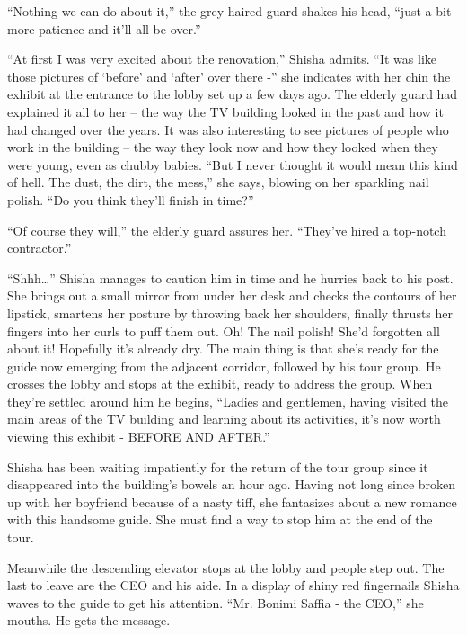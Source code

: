 \documentclass[twoside,11pt]{book}
\begin{document}
``Nothing we can do about it,'' the grey-haired guard shakes his head, ``just a
bit more patience and it'll all be over.''

``At first I was very excited about the renovation,'' Shisha admits. ``It was
like those pictures of `before' and `after' over there -'' she indicates with her chin the exhibit at the
entrance to the lobby set up a few days ago. The elderly guard had explained it all to her -- the way the TV building
looked in the past and how it had changed over the years. It was also interesting to see pictures of people who work in
the building -- the way they look now and how they looked when they were young, even as chubby babies.
``But I never thought it would mean this kind of hell. The dust, the dirt, the mess,'' she
says, blowing on her sparkling nail polish. ``Do you think they'll finish in time?''

``Of course they will,'' the elderly guard assures her. ``They've hired a
top-notch contractor.''

``Shhh{\dots}'' Shisha manages to caution him in time and he hurries back to his post. She
brings out a small mirror from under her desk and checks the contours of her lipstick, smartens her
posture by throwing back her shoulders, finally thrusts her fingers into her curls to puff them out.
Oh! The nail polish! She'd forgotten all about it! Hopefully it's already dry. The main thing is that she's ready for
the guide now emerging from the adjacent corridor, followed by his tour group. He crosses the lobby and stops at the
exhibit, ready to address the group. When they're settled around him he begins, ``Ladies and gentlemen,
having visited the main areas of the TV building and learning about its activities, it's now worth viewing this exhibit
- BEFORE AND AFTER.''

Shisha has been waiting impatiently for the return of the tour group since it disappeared into the building's bowels an
hour ago. Having not long since broken up with her boyfriend because of a nasty tiff, she fantasizes about a new
romance with this handsome guide. She must find a way to stop him at the end of the tour.

Meanwhile the descending elevator stops at the lobby and people step out. The last to leave are the CEO and his aide. In
a display of shiny red fingernails Shisha waves to the guide to get his attention. ``Mr.  Bonimi Saffia -
the CEO,'' she mouths. He gets the message.
\end{document}
